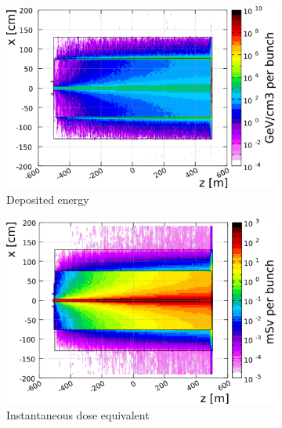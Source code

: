 \begin{figure}[h]
 \centering
  \begin{subfigure}[b]{0.49\textwidth}
   \centering
    \includegraphics[width=\textwidth]{Figures/BeamDump/Gasdump/Energy.png}
   \caption{Deposited energy}
   \end{subfigure}
   \hfill
   \begin{subfigure}[b]{0.49\textwidth}
   \centering
    \includegraphics[width=\textwidth]{Figures/BeamDump/Gasdump/Dose_eq.png}
   \caption{Instantaneous dose equivalent}
   \end{subfigure}\\
    \begin{subfigure}[b]{0.49\textwidth}
   \centering

\end{subfigure}
\end{figure}
